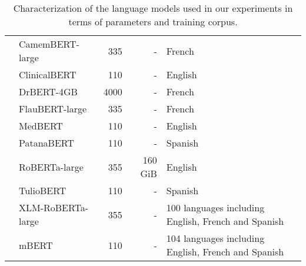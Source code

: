 \begin{table}
{\begin{tabular}{clrrl}
 & CamemBERT-large & 335 & - & French \\
 & ClinicalBERT & 110 & - & English \\
 & DrBERT-4GB & 4000 & - & French \\
 & FlauBERT-large & 335 & - & French \\
 & MedBERT & 110 & - & English \\
 & PatanaBERT & 110 & - & Spanish \\
 & RoBERTa-large & 355 & 160 GiB & English \\
 & TulioBERT & 110 & - & Spanish \\
 & XLM-RoBERTa-large & 355 & - & 100 languages including English, French and Spanish \\
 & mBERT \cite{devlin2019bert} & 110 & - & 104 languages including English, French and Spanish \\
\bottomrule
\end{tabular}}
\caption{Characterization of the language models used in our experiments in terms of parameters and training corpus.}
\label{tab:LM_features}
\end{table}
